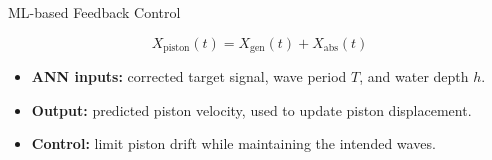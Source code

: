 \documentclass[aspectratio=43,11pt]{beamer}
\begin{document}
\begin{frame}[t]{ML-based Feedback Control}
\begin{center}
\begin{tikzpicture}[x=1cm,y=1cm]
\end{tikzpicture}

\end{center}
\[
\boxed{\,X_{\mathrm{piston}}(t)=X_{\mathrm{gen}}(t)+X_{\mathrm{abs}}(t)\,}
\]
\vspace{-4mm}

\begin{itemize}\setlength{\itemsep}{3pt}
  \item \textbf{ANN inputs:} corrected target signal,
        wave period $T$, and water depth $h$.
  \item \textbf{Output:} predicted piston velocity,
        used to update piston displacement.
  \item \textbf{Control:} limit piston drift while
        maintaining the intended waves.
\end{itemize}

\end{frame}

\end{document}
